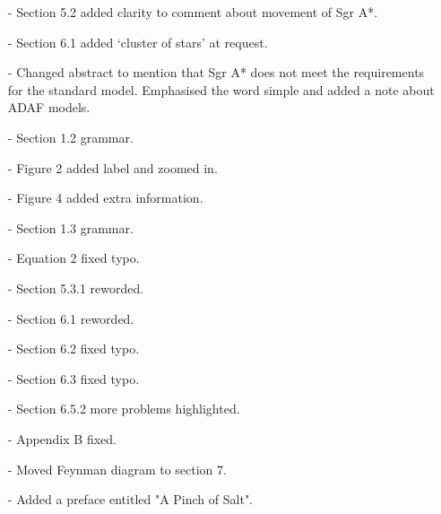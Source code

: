 {\begin{enumerate}
	 solutions and emphasised the precession as the main distinguishing feature.
\item[-] Section 5.2 added clarity to comment about movement of Sgr A*.
\item[-] Section 6.1 added `cluster of stars' at request.
\item[-] Changed abstract to mention that Sgr A* does not meet the requirements for the standard model.
	 Emphasised the word simple and added a note about ADAF models.
\item[-] Section 1.2 grammar.
\item[-] Figure 2 added label and zoomed in.
\item[-] Figure 4 added extra information.
\item[-] Section 1.3 grammar.
\item[-] Equation 2 fixed typo.
\item[-] Section 5.3.1 reworded.
\item[-] Section 6.1 reworded.
\item[-] Section 6.2 fixed typo.
\item[-] Section 6.3 fixed typo.
\item[-] Section 6.5.2 more problems highlighted.
\item[-] Appendix B fixed.
\item[-] Moved Feynman diagram to section 7.
\item[-] Added a preface entitled "A Pinch of Salt".
\end{enumerate}
}
\clearpage
%
